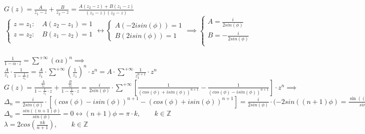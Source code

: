 \documentclass[12pt]{article}
\begin{document}
{{$G(z) = \frac{A}{z_1-z}+\frac{B}{z_2-z}=\frac{A(z_2-z)+B(z_1-z)}{(z_1-z)(z_2-z)}$\\
\begin{equation*}
	\begin{cases*}
		z=z_1: \quad A(z_2-z_1)=1\\
		z=z_2: \quad B(z_1-z_2)=1\\
	\end{cases*}
	\leftrightarrow
	\begin{cases*}
		A(-2isin(\phi))=1\\
		B(2isin(\phi))=1
	\end{cases*} \implies
	\begin{cases*}
		A=\frac{i}{2sin(\phi)}\\
		B = -\frac{i}{2sin(\phi)}\\
	\end{cases*}
\end{equation*}\\
$\frac{1}{1-\alpha \cdot z} = \sum^{+\infty} (\alpha z)^n \implies$\\
$\frac{A}{z_1}\cdot \frac{1}{1-\frac{1}{z_1}z} = \frac{A}{z_1} \cdot \sum^{+\infty} (\frac{1}{z_1})^n 
\cdot z^n =A \cdot \sum^{+\infty} \frac{1}{z_1^{n+1}} \cdot z^n$\\
$G(z) = \frac{\frac{A}{z_1}}{1-\frac{1}{z_1}\cdot z} + \frac{\frac{B}{z_2}}{1-\frac{1}{z_2}\cdot z}= \frac{i}{2sin(\phi)}\cdot \sum^{+\infty}[\frac{1}{(cos(\phi)+isin(\phi))^{n+1}} - \frac{1}{(cos(\phi)-isin(\phi))^{n+1}}]\cdot z^n \implies$
$\Delta_n = \frac{i}{2sin(\phi)}\cdot[(cos(\phi)-isin(\phi))^{n+1} - (cos(\phi)+isin(\phi))^{n+1}] = \frac{i}{2sin(\phi)}\cdot(-2sin((n+1)\phi) = \frac{\sin((n+1)\phi)}{sin(\phi)}$\\
$\Delta_n=\frac{sin((n+1)\phi)}{sin(\phi)} = 0 \leftrightarrow (n+1)\phi = \pi \cdot k, \qquad k \in \mathbb{Z}$\\
$\lambda = 2cos(\frac{\pi k}{n+1}), \qquad k \in \mathbb{Z}$

}
\newpage}
\end{document}
